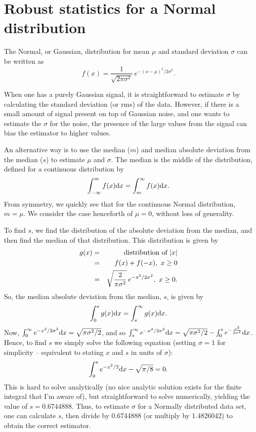 \documentclass[12pt,a4paper]{article}
\newcommand{\diff}{{\rm d}}
\begin{document}
\newpage
\section{Robust statistics for a Normal distribution}
\label{app-madfm}

The Normal, or Gaussian, distribution for mean $\mu$ and standard
deviation $\sigma$ can be written as 
\[ 
f(x) = \frac{1}{\sqrt{2\pi\sigma^2}}\ e^{-(x-\mu)^2/2\sigma^2}.
 \]

When one has a purely Gaussian signal, it is straightforward to
estimate $\sigma$ by calculating the standard deviation (or rms) of
the data. However, if there is a small amount of signal present on top
of Gaussian noise, and one wants to estimate the $\sigma$ for the
noise, the presence of the large values from the signal can bias the
estimator to higher values.

An alternative way is to use the median ($m$) and median absolute deviation
from the median ($s$) to estimate $\mu$ and $\sigma$. The median is the
middle of the distribution, defined for a continuous distribution by
\[
\int_{-\infty}^{m} f(x) \diff x = \int_{m}^{\infty} f(x) \diff x.
\]
From symmetry, we quickly see that for the continuous Normal
distribution, $m=\mu$. We consider the case henceforth of $\mu=0$,
without loss of generality.

To find $s$, we find the distribution of the absolute deviation from
the median, and then find the median of that distribution. This
distribution is given by
\begin{eqnarray*}
g(x) &= &{\mbox{\rm distribution of }} |x|\\
     &= &f(x) + f(-x),\ x\ge0\\
     &= &\sqrt{\frac{2}{\pi\sigma^2}}\, e^{-x^2/2\sigma^2},\ x\ge0.
\end{eqnarray*}
So, the median absolute deviation from the median, $s$, is given by
\[
\int_{0}^{s} g(x) \diff x = \int_{s}^{\infty} g(x) \diff x.
\]
Now, $\int_{0}^{\infty}e^{-x^2/2\sigma^2} \diff x = \sqrt{\pi\sigma^2/2}$, and
so $\int_{s}^{\infty} e^{-x^2/2\sigma^2} \diff x =
\sqrt{\pi\sigma^2/2} - \int_{0}^{s} e^{-\frac{x^2}{2\sigma^2}} \diff x
$. Hence, to find $s$ we simply solve the following equation (setting $\sigma=1$ for
simplicity -- equivalent to stating $x$ and $s$ in units of $\sigma$):
\[
\int_{0}^{s}e^{-x^2/2} \diff x - \sqrt{\pi/8} = 0.
\]
This is hard to solve analytically (no nice analytic solution exists
for the finite integral that I'm aware of), but straightforward to
solve numerically, yielding the value of $s=0.6744888$. Thus, to
estimate $\sigma$ for a Normally distributed data set, one can calculate
$s$, then divide by 0.6744888 (or multiply by 1.4826042) to obtain the
correct estimator.
\end{document}
